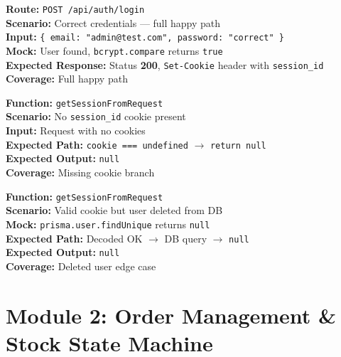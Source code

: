 \documentclass[12pt,a4paper]{report}
\newcommand{\pone}{\textbf{\color{p1red}P1}}
\newcommand{\ptwo}{\textbf{\color{p2orange}P2}}
\begin{document}
\begin{tcolorbox}[testbox, title={AUTH-014 \hfill \pone}]
\textbf{Route:} \texttt{POST /api/auth/login} \\
\textbf{Scenario:} Correct credentials --- full happy path \\
\textbf{Input:} \texttt{\{ email: "admin@test.com", password: "correct" \}} \\
\textbf{Mock:} User found, \texttt{bcrypt.compare} returns \texttt{true} \\
\textbf{Expected Response:} Status \textbf{200}, \texttt{Set-Cookie} header with \texttt{session\_id} \\
\textbf{Coverage:} Full happy path
\end{tcolorbox}

\begin{tcolorbox}[testbox, title={AUTH-015 \hfill \pone}]
\textbf{Function:} \texttt{getSessionFromRequest} \\
\textbf{Scenario:} No \texttt{session\_id} cookie present \\
\textbf{Input:} Request with no cookies \\
\textbf{Expected Path:} \texttt{cookie === undefined} $\to$ \texttt{return null} \\
\textbf{Expected Output:} \texttt{null} \\
\textbf{Coverage:} Missing cookie branch
\end{tcolorbox}

\begin{tcolorbox}[testbox, title={AUTH-016 \hfill \ptwo}]
\textbf{Function:} \texttt{getSessionFromRequest} \\
\textbf{Scenario:} Valid cookie but user deleted from DB \\
\textbf{Mock:} \texttt{prisma.user.findUnique} returns \texttt{null} \\
\textbf{Expected Path:} Decoded OK $\to$ DB query $\to$ \texttt{null} \\
\textbf{Expected Output:} \texttt{null} \\
\textbf{Coverage:} Deleted user edge case
\end{tcolorbox}



\chapter{Module 2: Order Management \& Stock State Machine}
\end{document}
